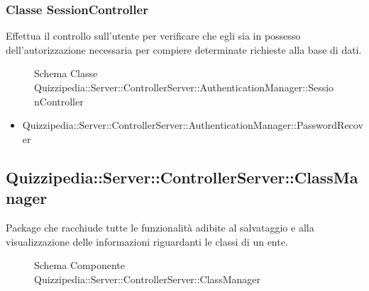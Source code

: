 \subsubsection{Classe SessionController}
Effettua il controllo sull'utente per verificare che egli sia in possesso dell'autorizzazione necessaria per compiere determinate richieste alla base di dati.
\begin{figure}[H]
\centering
\noindent{}
\caption{Schema Classe Quizzipedia::Server::ControllerServer::AuthenticationManager::SessionController}
\end{figure}
\begin{itemize}
\item Quizzipedia::Server::ControllerServer::AuthenticationManager::PasswordRecover
\end{itemize}
\subsection{Quizzipedia::Server::ControllerServer::ClassManager}
Package che racchiude tutte le funzionalità adibite al salvataggio e alla visualizzazione delle informazioni riguardanti le classi di un ente.
\begin{figure}[H]
\centering
\noindent{}
\caption[Quizzipedia::Server::ControllerServer::ClassManager]{Schema Componente Quizzipedia::Server::ControllerServer::ClassManager}
\end{figure}
